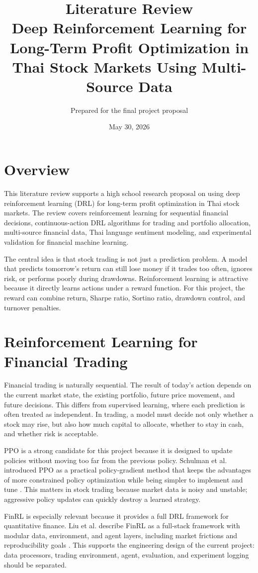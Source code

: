 \documentclass[11pt]{article}
\title{Literature Review\\Deep Reinforcement Learning for Long-Term Profit Optimization in Thai Stock Markets Using Multi-Source Data}
\author{Prepared for the final project proposal}
\date{May 30, 2026}
\begin{document}
\maketitle

\section{Overview}
This literature review supports a high school research proposal on using deep reinforcement learning (DRL) for long-term profit optimization in Thai stock markets. The review covers reinforcement learning for sequential financial decisions, continuous-action DRL algorithms for trading and portfolio allocation, multi-source financial data, Thai language sentiment modeling, and experimental validation for financial machine learning.

The central idea is that stock trading is not just a prediction problem. A model that predicts tomorrow's return can still lose money if it trades too often, ignores risk, or performs poorly during drawdowns. Reinforcement learning is attractive because it directly learns actions under a reward function. For this project, the reward can combine return, Sharpe ratio, Sortino ratio, drawdown control, and turnover penalties.

\section{Reinforcement Learning for Financial Trading}
Financial trading is naturally sequential. The result of today's action depends on the current market state, the existing portfolio, future price movement, and future decisions. This differs from supervised learning, where each prediction is often treated as independent. In trading, a model must decide not only whether a stock may rise, but also how much capital to allocate, whether to stay in cash, and whether risk is acceptable.

PPO is a strong candidate for this project because it is designed to update policies without moving too far from the previous policy. Schulman et al. introduced PPO as a practical policy-gradient method that keeps the advantages of more constrained policy optimization while being simpler to implement and tune \cite{ppo}. This matters in stock trading because market data is noisy and unstable; aggressive policy updates can quickly destroy a learned strategy.

FinRL is especially relevant because it provides a full DRL framework for quantitative finance. Liu et al. describe FinRL as a full-stack framework with modular data, environment, and agent layers, including market frictions and reproducibility goals \cite{finrl}. This supports the engineering design of the current project: data processors, trading environment, agent, evaluation, and experiment logging should be separated.
\end{document}
